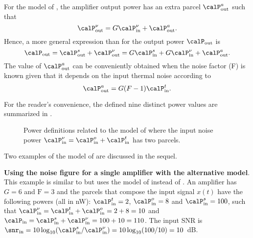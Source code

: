 For the model of , the amplifier output power has an extra parcel $\calP_{\textrm{out}}^{a}$ such that
\begin{equation}
\calP_{\textrm{out}}^{\nu} = G \calP_{\textrm{in}}^{\nu} + \calP_{\textrm{out}}^{a}.
\label{eq:outputNoiseDefinition}
\end{equation}
Hence, a more general expression than  for the output power $\calP_{\textrm{out}}$ is
\begin{equation}
\calP_{\textrm{out}} = \calP_{\textrm{out}}^{s} + \calP_{\textrm{out}}^{\nu} = G \calP_{\textrm{in}}^{s} + G \calP_{\textrm{in}}^{\nu} + \calP_{\textrm{out}}^{a}.
\label{eq:amplifierOutputPowerMoreGeneral}
\end{equation}
The value of $\calP_{\textrm{out}}^{a}$ can be conveniently obtained when the noise factor (F) is known given that it depends on the input thermal noise according to
\begin{equation}
\calP_{\textrm{out}}^{a} = G (F-1) \calP_{\textrm{in}}^{t}.
\label{eq:addedNoisePower}
\end{equation}

For the reader's convenience, the defined nine distinct power values are summarized in .

\begin{figure}[htbp]
  \begin{center}
  \end{center}
  \caption{Power definitions related to the model of  where the input noise power $\calP_{\textrm{in}}^{\nu} = \calP_{\textrm{in}}^{o} + \calP_{\textrm{in}}^{t}$ has two parcels.\label{fig:noiseFactorExplaineds}}  
\end{figure}

Two examples of the model of  are discussed in the sequel.

\bExample \textbf{Using the noise figure for a single amplifier with the alternative model}.
This example is similar to  but uses the model of  
instead of .
An amplifier has $G=6$ and $\textrm{F}=3$ and the parcels that compose the input signal $x(t)$ have the following powers (all in nW): 
$\calP_{\textrm{in}}^{t}=2$, $\calP_{\textrm{in}}^{o}=8$ and $\calP_{\textrm{in}}^{s}=100$, such that $\calP_{\textrm{in}}^{\nu} = \calP_{\textrm{in}}^{t}+\calP_{\textrm{in}}^{o} = 2+8=10$ and $\calP_{\textrm{in}}= \calP_{\textrm{in}}^{s} + \calP_{\textrm{in}}^{\nu}= 100+10=110$. The input SNR is
$\snr_{\textrm{in}}=10 \log_{10} (\calP_{\textrm{in}}^{s}/\calP_{\textrm{in}}^{\nu})= 10 \log_{10}(100/10)=10$~dB. 

